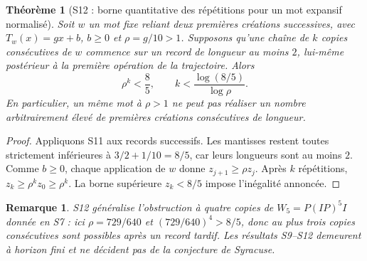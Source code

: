 \documentclass[11pt,a4paper]{article}
\newtheorem{theorem}{Théorème}
\newtheorem{remark}{Remarque}
\begin{document}
\begin{theorem}[S12 : borne quantitative des répétitions pour un mot expansif normalisé]
Soit $w$ un mot fixe reliant deux premières créations successives, avec $T_w(x)=g x+b$, $b\ge0$ et $\rho=g/10>1$. Supposons qu'une chaîne de $k$ copies consécutives de $w$ commence sur un record de longueur au moins $2$, lui-même postérieur à la première opération de la trajectoire. Alors
\[
\boxed{\rho^k<\frac85,\qquad k<\frac{\log(8/5)}{\log\rho}.}
\]
En particulier, un même mot à $\rho>1$ ne peut pas réaliser un nombre arbitrairement élevé de premières créations consécutives de longueur.
\end{theorem}
\begin{proof}
Appliquons S11 aux records successifs. Les mantisses restent toutes strictement inférieures à $3/2+1/10=8/5$, car leurs longueurs sont au moins $2$. Comme $b\ge0$, chaque application de $w$ donne $z_{j+1}\ge\rho z_j$. Après $k$ répétitions, $z_k\ge\rho^k z_0\ge\rho^k$. La borne supérieure $z_k<8/5$ impose l'inégalité annoncée.
\end{proof}
\begin{remark}
S12 généralise l'obstruction à quatre copies de $W_5=P(IP)^5I$ donnée en S7 : ici $\rho=729/640$ et $(729/640)^4>8/5$, donc au plus trois copies consécutives sont possibles après un record tardif. Les résultats S9--S12 demeurent à horizon fini et ne décident pas de la conjecture de Syracuse.
\end{remark}
\end{document}
